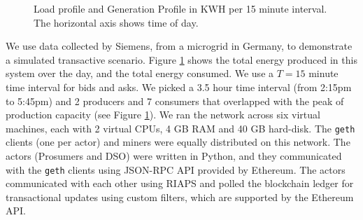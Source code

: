 

\begin{figure}[t]
\centering

\vspace{-2em}
\caption{Load profile and Generation Profile in KWH per 15 minute interval. The horizontal axis shows time of day.}
\label{fig:profile}
\end{figure}

We use  data collected by Siemens, from a microgrid in Germany,  to demonstrate a simulated transactive scenario. Figure \ref{fig:profile} shows the total energy produced in this system over the day, and  the total energy consumed. We use a $T=15$ minute time interval for bids and asks. We picked a 3.5 hour time interval (from 2:15pm to 5:45pm) and 2 producers and 7 consumers that overlapped with the peak of production capacity (see Figure \ref{fig:profile}). We ran the network across six virtual machines, each with 2 virtual CPUs, 4 GB RAM and 40 GB hard-disk. The \texttt{geth} clients (one per actor) and miners were equally distributed on this network. The actors (Prosumers and DSO) were written in Python, and they communicated with the \texttt{geth} clients using JSON-RPC API provided by Ethereum. The  actors communicated with each other using RIAPS and polled the blockchain ledger for transactional updates using custom filters, which are supported by the Ethereum API.

